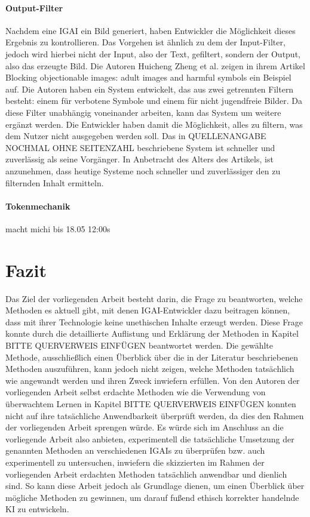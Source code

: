 \documentclass[12pt]{article}
\begin{document}
\subsubsection{Output-Filter}
Nachdem eine IGAI ein Bild generiert, haben Entwickler die Möglichkeit dieses Ergebnis zu kontrollieren. Das Vorgehen ist ähnlich zu dem der Input-Filter, jedoch wird hierbei nicht der Input, also der Text, gefiltert, sondern der Output, also das erzeugte Bild. Die Autoren Huicheng Zheng et al. zeigen in ihrem Artikel Blocking objectionable images: adult images and harmful symbols ein Beispiel auf. Die Autoren haben ein System entwickelt, das aus zwei getrennten Filtern besteht: einem für verbotene Symbole und einem für nicht jugendfreie Bilder. Da diese Filter unabhängig voneinander arbeiten, kann das System um weitere ergänzt werden. Die Entwickler haben damit die Möglichkeit, alles zu filtern, was dem Nutzer nicht ausgegeben werden soll. Das in QUELLENANGABE NOCHMAL OHNE SEITENZAHL beschriebene System ist schneller und zuverlässig als seine Vorgänger. In Anbetracht des Alters des Artikels, ist anzunehmen, dass heutige Systeme noch schneller und zuverlässiger den zu filternden Inhalt ermitteln.
\subsubsection{Tokenmechanik}
macht michi bis 18.05 12:00s

\chapter{Fazit}
Das Ziel der vorliegenden Arbeit besteht darin, die Frage zu beantworten, welche Methoden es aktuell gibt, mit denen IGAI-Entwickler dazu beitragen können, dass mit ihrer Technologie keine unethischen Inhalte erzeugt werden. Diese Frage konnte durch die detaillierte Auflistung und Erklärung der Methoden in Kapitel BITTE QUERVERWEIS EINFÜGEN beantwortet werden. Die gewählte Methode, ausschließlich einen Überblick über die in der Literatur beschriebenen Methoden auszuführen, kann jedoch nicht zeigen, welche Methoden tatsächlich wie angewandt werden und ihren Zweck inwiefern erfüllen. Von den Autoren der vorliegenden Arbeit selbst erdachte Methoden wie die Verwendung von überwachtem Lernen in Kapitel BITTE QUERVERWEIS EINFÜGEN konnten nicht auf ihre tatsächliche Anwendbarkeit überprüft werden, da dies den Rahmen der vorliegenden Arbeit sprengen würde. Es würde sich im Anschluss an die vorliegende Arbeit also anbieten, experimentell die tatsächliche Umsetzung der genannten Methoden an verschiedenen IGAIs zu überprüfen bzw. auch experimentell zu untersuchen, inwiefern die skizzierten im Rahmen der vorliegenden Arbeit erdachten Methoden tatsächlich anwendbar und dienlich sind.
So kann diese Arbeit jedoch als Grundlage dienen, um einen Überblick über mögliche Methoden zu gewinnen, um darauf fußend ethisch korrekter handelnde KI zu entwickeln.



\end{document}
